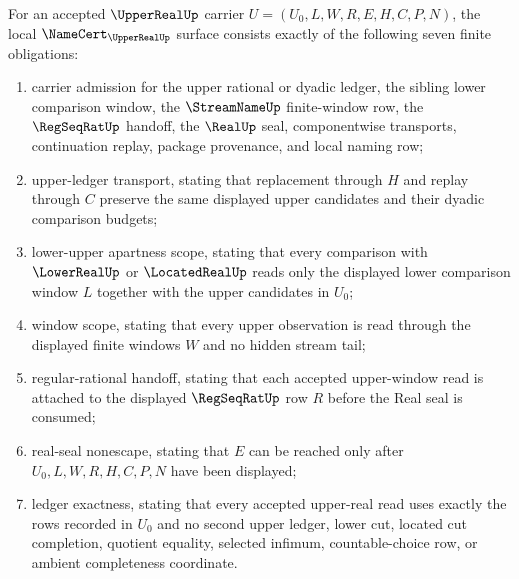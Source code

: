 \begin{theorem}
\label{thm:upper-real-obligation-surface}
For an accepted $\UpperRealUp$ carrier $U=(U_0,L,W,R,E,H,C,P,N)$, the local $\NameCert_{\UpperRealUp}$ surface consists exactly of the following seven finite obligations:
\begin{enumerate}
\item carrier admission for the upper rational or dyadic ledger, the sibling lower comparison window, the $\StreamNameUp$ finite-window row, the $\RegSeqRatUp$ handoff, the $\RealUp$ seal, componentwise transports, continuation replay, package provenance, and local naming row;
\item upper-ledger transport, stating that replacement through $H$ and replay through $C$ preserve the same displayed upper candidates and their dyadic comparison budgets;
\item lower-upper apartness scope, stating that every comparison with $\LowerRealUp$ or $\LocatedRealUp$ reads only the displayed lower comparison window $L$ together with the upper candidates in $U_0$;
\item window scope, stating that every upper observation is read through the displayed finite windows $W$ and no hidden stream tail;
\item regular-rational handoff, stating that each accepted upper-window read is attached to the displayed $\RegSeqRatUp$ row $R$ before the Real seal is consumed;
\item real-seal nonescape, stating that $E$ can be reached only after $U_0,L,W,R,H,C,P,N$ have been displayed;
\item ledger exactness, stating that every accepted upper-real read uses exactly the rows recorded in $U_0$ and no second upper ledger, lower cut, located cut completion, quotient equality, selected infimum, countable-choice row, or ambient completeness coordinate.
\end{enumerate}
\end{theorem}

